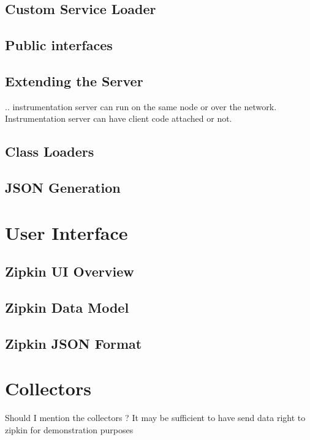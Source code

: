 \subsection{Custom Service Loader}
\subsection{Public interfaces}
\subsection{Extending the Server}
.. instrumentation server can run on the same node or over the network. Instrumentation server can have client code attached or not.
\subsection{Class Loaders}
\subsection{JSON Generation}
\section{User Interface}
\label{sec:zipkin_ui}
\subsection{Zipkin UI Overview}
\subsection{Zipkin Data Model}
\subsection{Zipkin JSON Format}
\section{Collectors}
Should I mention the collectors ? It may be sufficient to have send data right to zipkin for demonstration purposes
